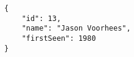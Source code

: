 
\begin{lstlisting}
{
    "id": 13,
    "name": "Jason Voorhees",
    "firstSeen": 1980
}
\end{lstlisting}
